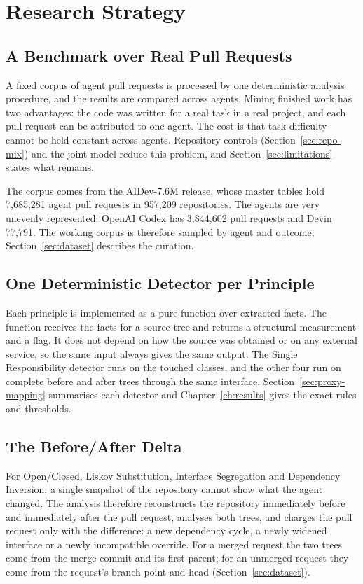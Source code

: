 \section{Research Strategy}
\label{sec:strategy}

\subsection{A Benchmark over Real Pull Requests}

A fixed corpus of agent pull requests is processed by one deterministic analysis procedure, and the
results are compared across agents. Mining finished work has two advantages: the code was written
for a real task in a real project, and each pull request can be attributed to one agent. The cost is
that task difficulty cannot be held constant across agents. Repository controls
(Section~\ref{sec:repo-mix}) and the joint model reduce this problem, and
Section~\ref{sec:limitations} states what remains.

The corpus comes from the AIDev-7.6M release, whose master tables hold 7,685,281 agent pull
requests in 957,209 repositories. The agents are very unevenly represented: OpenAI Codex has
3,844,602 pull requests and Devin 77,791. The working corpus is therefore sampled by agent and
outcome; Section~\ref{sec:dataset} describes the curation.

\subsection{One Deterministic Detector per Principle}

Each principle is implemented as a pure function over extracted facts. The function receives the
facts for a source tree and returns a structural measurement and a flag. It does not depend on how
the source was obtained or on any external service, so the same input always gives the same output.
The Single Responsibility detector runs on the touched classes, and the other four run on complete
before and after trees through the same interface. Section~\ref{sec:proxy-mapping} summarises each
detector and Chapter~\ref{ch:results} gives the exact rules and thresholds.

\subsection{The Before/After Delta}
\label{sec:delta-harness}

For Open/Closed, Liskov Substitution, Interface Segregation and Dependency Inversion, a single
snapshot of the repository cannot show what the agent changed. The analysis therefore reconstructs
the repository immediately before and immediately after the pull request, analyses both trees, and
charges the pull request only with the difference: a new dependency cycle, a newly widened interface
or a newly incompatible override. For a merged request the two trees
come from the merge commit and its first parent; for an unmerged request they come from the
request's branch point and head (Section~\ref{sec:dataset}).

